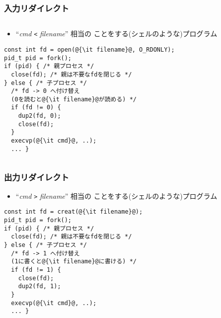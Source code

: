 \documentclass[12pt,dvipdfmx]{beamer}
\begin{document}
\begin{frame}[fragile]
  \frametitle{入力リダイレクト}
  \begin{columns}
  \begin{column}{0.6\textwidth}
  \begin{itemize}
  \item ``{\it cmd} {\tt <} {\it filename}'' 相当の
    ことをする(シェルのような)プログラム
  \end{itemize}
\begin{lstlisting}
const int fd = open(@{\it filename}@, O_RDONLY);
pid_t pid = fork(); 
if (pid) { /* 親プロセス */
  close(fd); /* 親は不要なfdを閉じる */
} else { /* 子プロセス */
  /* fd -> 0 へ付け替え
  (0を読むと@{\it filename}@が読める) */
  if (fd != 0) {
    dup2(fd, 0);
    close(fd);
  }
  execvp(@{\it cmd}@, ..);
  ... }
\end{lstlisting}
  \end{column}
  \begin{column}{0.4\textwidth}
\begin{center}
%
%
%
%
%
%
\end{center}
  \end{column}
\end{columns}
\end{frame}


\begin{frame}[fragile]
  \frametitle{出力リダイレクト}
  \begin{itemize}
  \item ``{\it cmd} {\tt >} {\it filename}'' 相当の
    ことをする(シェルのような)プログラム
  \end{itemize}
\begin{lstlisting}
const int fd = creat(@{\it filename}@);
pid_t pid = fork(); 
if (pid) { /* 親プロセス */
  close(fd); /* 親は不要なfdを閉じる */
} else { /* 子プロセス */
  /* fd -> 1 へ付け替え
  (1に書くと@{\it filename}@に書ける) */
  if (fd != 1) {
    close(fd);
    dup2(fd, 1);
  }
  execvp(@{\it cmd}@, ..);
  ... }
\end{lstlisting}
\end{frame}
\end{document}

